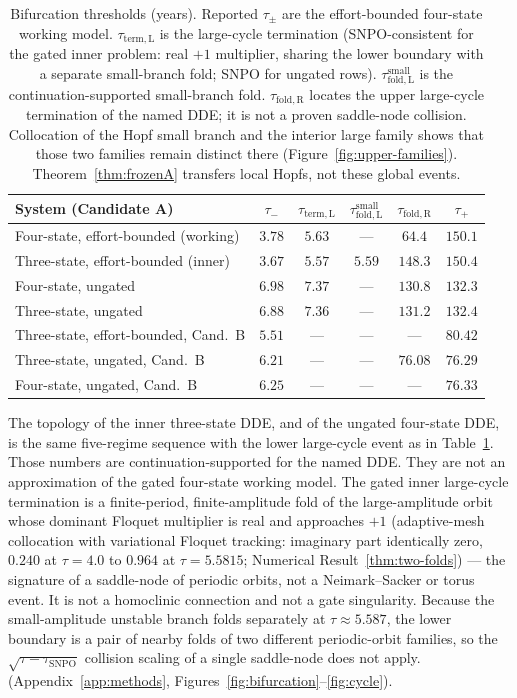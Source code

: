 \documentclass[11pt]{article}
\theoremstyle{definition}
\begin{document}
\begin{table}[t]
\centering\small
\caption{Bifurcation thresholds (years). Reported $\tau_\pm$ are the effort-bounded four-state working model. $\tau_{\mathrm{term,L}}$ is the large-cycle termination (SNPO-consistent for the gated inner problem: real $+1$ multiplier, sharing the lower boundary with a separate small-branch fold; SNPO for ungated rows). $\tau_{\mathrm{fold,L}}^{\mathrm{small}}$ is the continuation-supported small-branch fold. $\tau_{\mathrm{fold,R}}$ locates the upper large-cycle termination of the named DDE; it is not a proven saddle-node collision. Collocation of the Hopf small branch and the interior large family shows that those two families remain distinct there (Figure~\ref{fig:upper-families}). Theorem~\ref{thm:frozenA} transfers local Hopfs, not these global events.}
\label{tab:thresholds}
\begin{tabular}{lccccc}
\toprule
System (Candidate A) & $\tau_-$ & $\tau_{\mathrm{term,L}}$ & $\tau_{\mathrm{fold,L}}^{\mathrm{small}}$ & $\tau_{\mathrm{fold,R}}$ & $\tau_+$ \\
\midrule
Four-state, effort-bounded (working) & $3.78$ & $5.63$ & --- & $64.4$ & $150.1$ \\
Three-state, effort-bounded (inner) & $3.67$ & $5.57$ & $5.59$ & $148.3$ & $150.4$ \\
Four-state, ungated & $6.98$ & $7.37$ & --- & $130.8$ & $132.3$ \\
Three-state, ungated & $6.88$ & $7.36$ & --- & $131.2$ & $132.4$ \\
\midrule
Three-state, effort-bounded, Cand.\ B & $5.51$ & --- & --- & --- & $80.42$ \\
Three-state, ungated, Cand.\ B & $6.21$ & --- & --- & $76.08$ & $76.29$ \\
Four-state, ungated, Cand.\ B & $6.25$ & --- & --- & --- & $76.33$ \\
\bottomrule
\end{tabular}
\end{table}

The topology of the inner three-state DDE, and of the ungated four-state DDE, is the same five-regime sequence with the lower large-cycle event as in Table~\ref{tab:thresholds}. Those numbers are continuation-supported for the named DDE. They are not an approximation of the gated four-state working model. The gated inner large-cycle termination is a finite-period, finite-amplitude fold of the large-amplitude orbit whose dominant Floquet multiplier is real and approaches $+1$ (adaptive-mesh collocation with variational Floquet tracking: imaginary part identically zero, $0.240$ at $\tau=4.0$ to $0.964$ at $\tau=5.5815$; Numerical Result~\ref{thm:two-folds}) --- the signature of a saddle-node of periodic orbits, not a Neimark--Sacker or torus event. It is not a homoclinic connection and not a gate singularity. Because the small-amplitude unstable branch folds separately at $\tau\approx 5.587$, the lower boundary is a pair of nearby folds of two different periodic-orbit families, so the $\sqrt{\tau-\tau_{\mathrm{SNPO}}}$ collision scaling of a single saddle-node does not apply. (Appendix~\ref{app:methods}, Figures~\ref{fig:bifurcation}--\ref{fig:cycle}).
\end{document}
